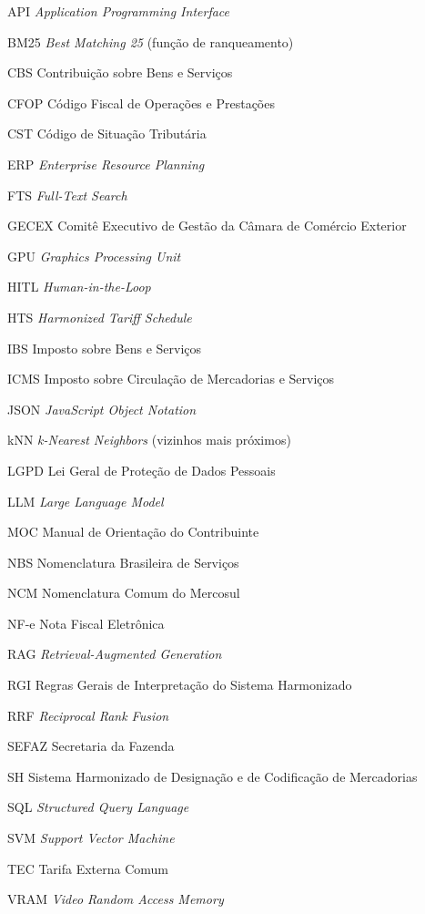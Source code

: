 \begin{siglas}
  \item[API] \textit{Application Programming Interface}
  \item[BM25] \textit{Best Matching 25} (função de ranqueamento)
  \item[CBS] Contribuição sobre Bens e Serviços
  \item[CFOP] Código Fiscal de Operações e Prestações
  \item[CST] Código de Situação Tributária
  \item[ERP] \textit{Enterprise Resource Planning}
  \item[FTS] \textit{Full-Text Search}
  \item[GECEX] Comitê Executivo de Gestão da Câmara de Comércio Exterior
  \item[GPU] \textit{Graphics Processing Unit}
  \item[HITL] \textit{Human-in-the-Loop}
  \item[HTS] \textit{Harmonized Tariff Schedule}
  \item[IBS] Imposto sobre Bens e Serviços
  \item[ICMS] Imposto sobre Circulação de Mercadorias e Serviços
  \item[JSON] \textit{JavaScript Object Notation}
  \item[kNN] \textit{k-Nearest Neighbors} (vizinhos mais próximos)
  \item[LGPD] Lei Geral de Proteção de Dados Pessoais
  \item[LLM] \textit{Large Language Model}
  \item[MOC] Manual de Orientação do Contribuinte
  \item[NBS] Nomenclatura Brasileira de Serviços
  \item[NCM] Nomenclatura Comum do Mercosul
  \item[NF-e] Nota Fiscal Eletrônica
  \item[RAG] \textit{Retrieval-Augmented Generation}
  \item[RGI] Regras Gerais de Interpretação do Sistema Harmonizado
  \item[RRF] \textit{Reciprocal Rank Fusion}
  \item[SEFAZ] Secretaria da Fazenda
  \item[SH] Sistema Harmonizado de Designação e de Codificação de Mercadorias
  \item[SQL] \textit{Structured Query Language}
  \item[SVM] \textit{Support Vector Machine}
  \item[TEC] Tarifa Externa Comum
  \item[VRAM] \textit{Video Random Access Memory}
\end{siglas}
